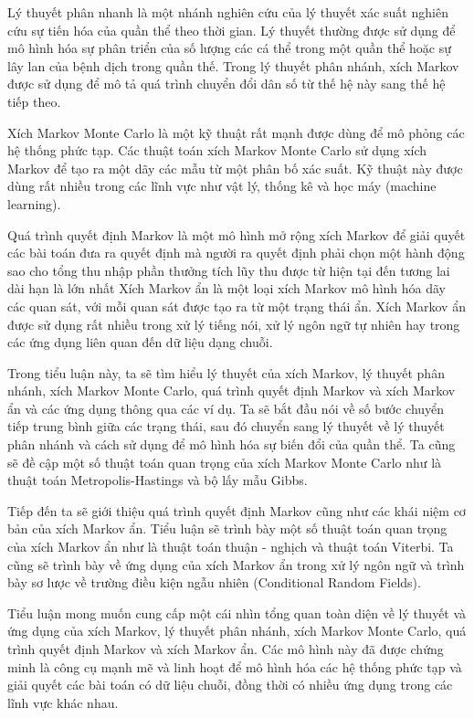 \documentclass[14pt, a4paper]{article}
\numberwithin{equation}{section}
\numberwithin{figure}{section}
\theoremstyle{sltheorem}
\theoremstyle{soltheorem}
\numberwithin{dl}{section}
\numberwithin{md}{section}
\numberwithin{vd}{section}
\begin{document}
    Lý thuyết phân nhanh là một nhánh nghiên cứu của lý thuyết xác suất nghiên cứu sự tiến hóa của quần thể theo thời gian.
    Lý thuyết thường được sử dụng để mô hình hóa sự phân triển của số lượng các cá thể trong một quần thể hoặc sự lây lan của bệnh dịch trong quần thế.
    Trong lý thuyết phân nhánh, xích Markov được sử dụng để mô tả quá trình chuyển đổi dân số từ thế hệ này sang thế hệ tiếp theo.

    Xích Markov Monte Carlo là một kỹ thuật rất mạnh được dùng để mô phỏng các hệ thống phức tạp.
    Các thuật toán xích Markov Monte Carlo sử dụng xích Markov để tạo ra một dãy các mẫu từ một phân bố xác suất.
    Kỹ thuật này được dùng rất nhiều trong các lĩnh vực như vật lý, thống kê và học máy (machine learning).

    Quá trình quyết định Markov là một mô hình mở rộng xích Markov để giải quyết các bài toán đưa ra quyết định mà người ra quyết định phải chọn một hành động sao cho tổng thu nhập phần thưởng tích lũy thu được từ hiện tại đến tương lai dài hạn là lớn nhất
    Xích Markov ẩn là một loại xích Markov mô hình hóa dãy các quan sát, với mỗi quan sát được tạo ra từ một trạng thái ẩn.
    Xích Markov ẩn được sử dụng rất nhiều trong xử lý tiếng nói, xử lý ngôn ngữ tự nhiên hay trong các ứng dụng liên quan đến dữ liệu dạng chuỗi.

    Trong tiểu luận này, ta sẽ tìm hiểu lý thuyết của xích Markov, lý thuyết phân nhánh, xích Markov Monte Carlo, quá trình quyết định Markov và xích Markov ẩn và các ứng dụng thông qua các ví dụ.
    Ta sẽ bắt đầu nói về số bước chuyển tiếp trung bình giữa các trạng thái, sau đó chuyển sang lý thuyết về lý thuyết phân nhánh và cách sử dụng để mô hình hóa sự biến đổi của quần thể.
    Ta cũng sẽ đề cập một số thuật toán quan trọng của xích Markov Monte Carlo như là thuật toán Metropolis-Hastings và bộ lấy mẫu Gibbs.

    Tiếp đến ta sẽ giới thiệu quá trình quyết định Markov cũng như các khái niệm cơ bản của xích Markov ẩn.
    Tiểu luận sẽ trình bày một số thuật toán quan trọng của xích Markov ẩn như là thuật toán thuận - nghịch và thuật toán Viterbi.
    Ta cũng sẽ trình bày về ứng dụng của xích Markov ẩn trong xử lý ngôn ngữ và trình bày sơ lược về trường điều kiện ngẫu nhiên (Conditional Random Fields).

    Tiểu luận mong muốn cung cấp một cái nhìn tổng quan toàn diện về lý thuyết và ứng dụng của xích Markov, lý thuyết phân nhánh, xích Markov Monte Carlo, quá trình quyết định Markov và xích Markov ẩn.
    Các mô hình này đã được chứng minh là công cụ mạnh mẽ và linh hoạt để mô hình hóa các hệ thống phức tạp và giải quyết các bài toán có dữ liệu chuỗi, đồng thời có nhiều ứng dụng trong các lĩnh vực khác nhau.
\end{document}
